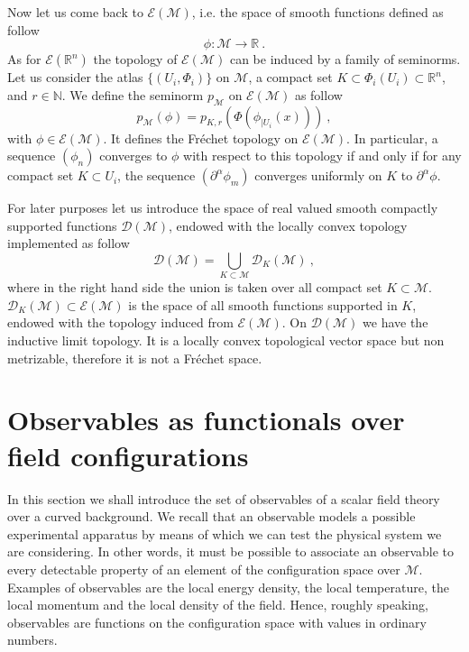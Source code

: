 \documentclass[11pt]{book}
\newcommand{\Dcal}{\mathcal{D}}
\newcommand{\Ecal}{\mathcal{E}}
\newcommand{\Mcal}{\mathcal{M}}
\newcommand{\Nbb}{\mathbb{N}}
\newcommand{\Rbb}{\mathbb{R}}
\theoremstyle{break}
\begin{document}
Now let us come back to $\Ecal(\Mcal)$, i.e. the space of smooth functions defined as follow
%
\begin{equation*}
\phi : \Mcal \to \Rbb \ . 
\end{equation*}
%
As for $\Ecal(\Rbb^n)$ the topology of $\Ecal(\Mcal)$ can be induced by a family of seminorms. Let us consider the atlas $\{(U_i,\Phi_i)\}$ on $\Mcal$, a compact set $K \subset \Phi_i(U_i) \subset \Rbb^n$, and $r \in \Nbb$. We define the seminorm $p_\Mcal$ on $\Ecal(\Mcal)$ as follow
%
\begin{equation*}
p_\Mcal(\phi) = p_{K,r}\left( \Phi\left( \phi_{|U_i}(x) \right) \right) \ ,
\end{equation*}
%
with $\phi \in \Ecal\left(\Mcal \right)$. It defines the Fréchet topology on $\Ecal\left(\Mcal \right)$. In particular, a sequence $(\phi_n)$ converges to $\phi$ with respect to this topology if and only if for any compact set $K \subset U_i$, the sequence $\left(\partial^\alpha\phi_m\right)$ converges uniformly on $K$ to $\partial^\alpha\phi$.


For later purposes let us introduce the space of real valued smooth compactly supported functions $\Dcal(\Mcal)$, endowed with the locally convex topology implemented as follow
%
\begin{equation*}
\Dcal(\Mcal) = \bigcup_{K\subset\Mcal} \Dcal_K(\Mcal) \ ,
\end{equation*}
%
where in the right hand side the union is taken over all compact set $K \subset \Mcal$. $\Dcal_K(\Mcal) \subset \Ecal(\Mcal)$ is the space of all smooth functions supported in $K$, endowed with the topology induced from $\Ecal(\Mcal)$. On $\Dcal(\Mcal)$ we have the inductive limit topology. It is a locally convex topological vector space but non metrizable, therefore it is not a Fréchet space. 


\section{Observables as functionals over field configurations}\label{p:OBS}


In this section we shall introduce the set of observables of a scalar field theory over a curved background. We recall that an observable models a possible experimental apparatus by means of which we can test the physical system we are considering. In other words, it must be possible to associate an observable to every detectable property of an element of the configuration space over $\Mcal$. Examples of observables are the local energy density, the local temperature, the local momentum and the local density of the field.  Hence, roughly speaking, observables are functions on the configuration space with values in ordinary numbers.
\end{document}
